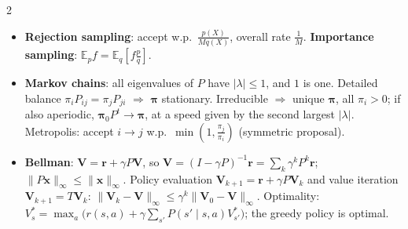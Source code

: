 \documentclass[10pt]{article}
\newcommand{\norm}[1]{\lVert #1 \rVert}
\newcommand{\E}{\mathbb{E}}
\begin{document}
\begin{multicols}{2}
\begin{itemize}
    \item \textbf{Rejection sampling}: accept w.p.\ $\frac{p(X)}{Mq(X)}$, overall rate $\frac{1}{M}$. \textbf{Importance sampling}: $\E_p f = \E_q[f\frac{p}{q}]$.
    \item \textbf{Markov chains}: all eigenvalues of $P$ have $|\lambda| \leq 1$, and $1$ is one. Detailed balance $\pi_iP_{ij} = \pi_jP_{ji}$ $\Rightarrow$ $\boldsymbol\pi$ stationary. Irreducible $\Rightarrow$ unique $\boldsymbol\pi$, all $\pi_i > 0$; if also aperiodic, $\boldsymbol\pi_0P^t \to \boldsymbol\pi$, at a speed given by the second largest $|\lambda|$. Metropolis: accept $i \to j$ w.p.\ $\min(1, \frac{\pi_j}{\pi_i})$ (symmetric proposal).
    \item \textbf{Bellman}: $\mathbf{V} = \mathbf{r} + \gamma P\mathbf{V}$, so $\mathbf{V} = (I - \gamma P)^{-1}\mathbf{r} = \sum_k\gamma^kP^k\mathbf{r}$; $\norm{P\mathbf{x}}_\infty \leq \norm{\mathbf{x}}_\infty$. Policy evaluation $\mathbf{V}_{k+1} = \mathbf{r} + \gamma P\mathbf{V}_k$ and value iteration $\mathbf{V}_{k+1} = T\mathbf{V}_k$: $\norm{\mathbf{V}_k - \mathbf{V}}_\infty \leq \gamma^k\norm{\mathbf{V}_0 - \mathbf{V}}_\infty$. Optimality: $V^*_s = \max_a\big(r(s, a) + \gamma\sum_{s'}P(s' \mid s, a)V^*_{s'}\big)$; the greedy policy is optimal.
\end{itemize}


\end{multicols}
\end{document}
